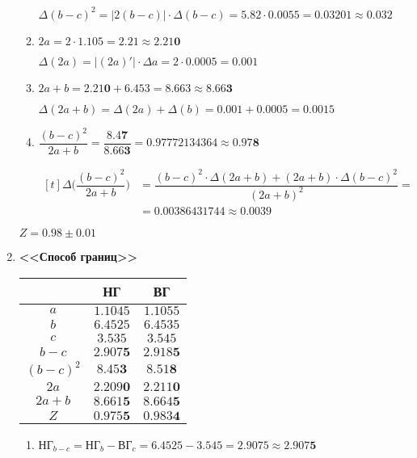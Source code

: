 \documentclass[a4paper, 14pt, fleqn]{extarticle}
\begin{document}
\begin{enumerate}
\begin{enumerate}[label*=\arabic*.]
							\( \Delta (b - c)^2 = |2(b - c)| \cdot \Delta (b - c) = 5.82 \cdot 0.0055 = 0.03201 \approx 0.032 \)

						\item \( 2a = 2 \cdot 1.105 = 2.21 \approx 2.21\mathbf{0} \) 

							\( \Delta(2a)  = |(2a)'| \cdot \Delta a = 2 \cdot 0.0005 = 0.001  \)

						\item \( 2a + b  = 2.21\mathbf{0} + 6.453 = 8.663 \approx 8.66\mathbf{3} \)
							
							\( \Delta (2a + b) = \Delta (2a) + \Delta (b) = 0.001 + 0.0005 = 0.0015 \)

						\item \( \dfrac{(b-c)^2}{2a+b} = \dfrac{8.4\mathbf{7}}{8.66\mathbf{3}} = 0.97772134364 \approx 0.97\mathbf{8} \) 

							\(\begin{aligned}[t] \Delta \biggl(\dfrac{(b - c)^2}{2a + b}\biggl) &= \dfrac{(b-c)^2 \cdot \Delta(2a+b) + (2a+b) \cdot \Delta(b-c)^2}{(2a+b)^2}=\\&= 0.00386431744 \approx 0.0039 \end{aligned}\)
					\end{enumerate}
					\( Z = 0.98 \pm 0.01 \)
				\pagebreak
				\item \textbf{<<Способ границ>>}
					\begin{center}
						\begin{tabular}{| c | c | c |}
							\hline
							\hphantom{2a + b} & НГ  &  ВГ  \\
							\hline
							\( a \) & \( 1.1045 \) & \( 1.1055 \) \\
							\hline 
							\( b \) & \( 6.4525 \) & \( 6.4535 \) \\
							\hline
							\( c \) & \( 3.535 \) & \( 3.545 \) \\
							\hline
							\( b - c \) & \( 2.907\mathbf{5} \) & \( 2.918\mathbf{5} \) \\
							\hline
							\( (b - c )^2\) & \( 8.45\mathbf{3} \) & \( 8.51\mathbf{8} \) \\
							\hline
							\( 2a \) & \( 2.209\mathbf{0} \) & \( 2.211\mathbf{0}\) \\
							\hline
							\( 2a + b \) & \( 8.661\mathbf{5} \) & \( 8.664\mathbf{5} \) \\
							\hline
							\( Z \) & \( 0.975\mathbf{5} \) & \( 0.983\mathbf{4} \) \\
							\hline
						\end{tabular}
					\end{center}
				\begin{enumerate}[label*=\arabic*.]
					\item \( \textrm{НГ}_{b-c} = \textrm{НГ}_{b} - \textrm{ВГ}_{c} = 6.4525 - 3.545 = 2.9075 \approx 2.907\mathbf{5} \)


\end{enumerate}
\end{enumerate}
\end{document}
